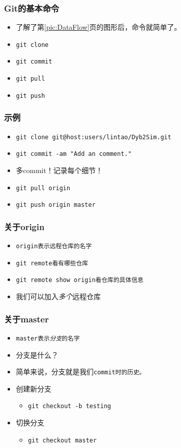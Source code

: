 \begin{frame}
    \frametitle{Git的基本命令}
    \begin{itemize}    
        \item 了解了第\ref{pic:DataFlow}页的图形后，命令就简单了。
        \item \tt{git clone}
        \item \tt{git commit}
        \item \tt{git pull}
        \item \tt{git push}
    \end{itemize}
\end{frame}

\begin{frame}
    \frametitle{示例}
    \begin{itemize}    
        \item \tt{\footnotesize{git clone git@host:users/lintao/Dyb2Sim.git}}
        \item \tt{\footnotesize{git commit -am "Add an comment."}}
        \item 多commit！记录每个细节！
        \item \tt{\footnotesize{git pull origin}}
        \item \tt{\footnotesize{git push origin master}}
    \end{itemize}
\end{frame}

\begin{frame}
    \frametitle{关于origin}
    \begin{itemize}
        \item \tt{origin}表示远程仓库的名字
        \item \tt{\footnotesize{git remote}}看有哪些仓库
        \item \tt{\footnotesize{git remote show origin}}看仓库的具体信息
        \item 我们可以加入\emph{多个}远程仓库
    \end{itemize}
\end{frame}

\begin{frame}
    \frametitle{关于master}
    \begin{itemize}
        \item \tt{master}表示\emph{分支}的名字
        \item 分支是什么？
        \item 简单来说，分支就是我们\tt{commit}时的历史。
        \item 创建新分支
            \begin{itemize}
                \item \tt{\footnotesize{git checkout -b testing}}
            \end{itemize}
        \item 切换分支
            \begin{itemize}
                \item \tt{\footnotesize{git checkout master}}
            \end{itemize}
    \end{itemize}
\end{frame}

